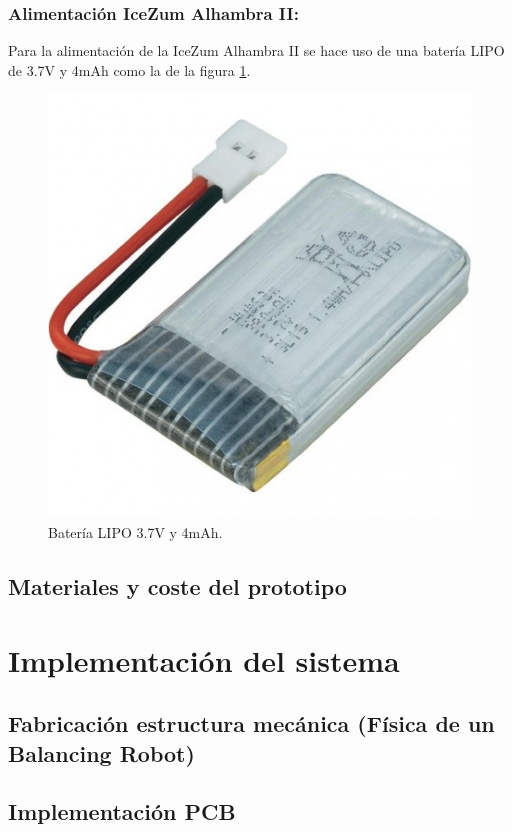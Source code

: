 \subsubsection{Alimentación IceZum Alhambra II:}

Para la alimentación de la IceZum Alhambra II se hace uso de una batería LIPO de 3.7V y 4mAh como la de la figura \ref{fig:lipo37}. 


\begin{center}
	\begin{figure}[H]
		\center
		\includegraphics[scale=0.5]{imagenes/Balancing_Robot/LIPO37}
		\caption{Batería LIPO 3.7V y 4mAh.}
		\label{fig:lipo37}
	\end{figure}
\end{center}

\subsection{Materiales y coste del prototipo}
\section{Implementación del sistema}\label{sec:Implementacion}
\subsection{Fabricación estructura mecánica (Física de un Balancing Robot)}
\subsection{Implementación PCB}

